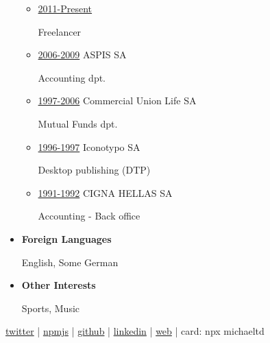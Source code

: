 \documentclass[11pt]{article}
\begin{document}
\begin{itemize}
\begin{itemize}
\item \uline{2011-Present}

Freelancer

\item \uline{2006-2009} ASPIS SA

Accounting dpt.

\item \uline{1997-2006} Commercial Union Life SA

Mutual Funds dpt.

\item \uline{1996-1997} Iconotypo SA

Desktop publishing (DTP)

\item \uline{1991-1992} CIGNA HELLAS SA

Accounting - Back office
\end{itemize}

\item \textbf{Foreign Languages}

English, Some German

\item \textbf{Other Interests}

Sports, Music
\end{itemize}

\href{https://twitter.com/tsouchlarakismd}{twitter} | \href{https://npmjs.com/\~michaeltd}{npmjs} | \href{https://github.com/michaeltd}{github} | \href{https://linkedin.com/in/michaeltd}{linkedin} | \href{https://michael.heliohost.org/}{web} | card: npx michaeltd
\end{document}
